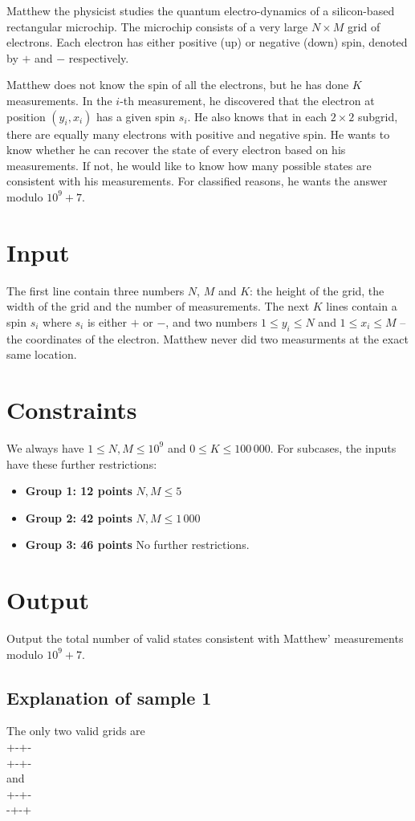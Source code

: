 
Matthew the physicist studies the quantum electro-dynamics of a silicon-based rectangular microchip. The microchip consists of a very large $N \times M$ grid of electrons. Each electron has either positive (up) or negative (down) spin, denoted by $+$ and $-$ respectively.

Matthew does not know the spin of all the electrons, but he has done $K$ measurements. In the $i$-th measurement, he discovered that the electron at position $(y_i, x_i)$ has a given spin $s_i$. He also knows that in each $2\times2$ subgrid, there are equally many electrons with positive and negative spin. He wants to know whether he can recover the state of every electron based on his measurements. If not, he would like to know how many possible states are consistent with his measurements. For classified reasons, he wants the answer modulo $10 ^ 9 + 7$.

\section*{Input}
The first line contain three numbers $N$, $M$ and $K$: the height of the grid, the width of the grid and the number of measurements. The next $K$ lines contain a spin $s_i$ where $s_i$ is either $+$ or $-$, and two numbers $1 \leq y_i \leq N$ and $1 \leq x_i \leq M$ -- the coordinates of the electron. Matthew never did two measurments at the exact same location.

\section*{Constraints}
We always have $1 \leq N, M \leq 10^9$ and $0 \leq K \leq 100\,000$. For subcases, the inputs have these further restrictions:
\begin{itemize}
\item{\textbf{Group 1: 12 points}} $N, M \leq 5$
\item{\textbf{Group 2: 42 points}} $N, M \leq 1\,000$
\item{\textbf{Group 3: 46 points}} No further restrictions.
\end{itemize}

\section*{Output}
Output the total number of valid states consistent with Matthew' measurements modulo $10 ^ 9 + 7$.

\subsection*{Explanation of sample 1}
The only two valid grids are\\
+-+- \\
+-+- \\
and \\
+-+- \\
-+-+ \\
